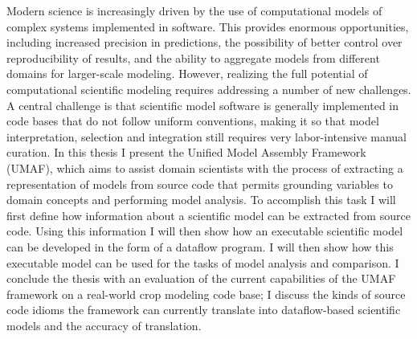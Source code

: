 
\noindent Modern science is increasingly driven by the use of computational models of complex systems implemented in software.
This provides enormous opportunities, including increased precision in predictions, the possibility of better control over reproducibility of results, and the ability to aggregate models from different domains for larger-scale modeling.
However, realizing the full potential of computational scientific modeling requires addressing a number of new challenges.
A central challenge is that scientific model software is generally implemented in code bases that do not follow uniform conventions, making it so that model interpretation, selection and integration still requires very labor-intensive manual curation.
In this thesis I present the Unified Model Assembly Framework (UMAF), which aims to assist domain scientists with the process of extracting a representation of models from source code that permits grounding variables to domain concepts and performing model analysis.
To accomplish this task I will first define how information about a scientific model can be extracted from source code.
Using this information I will then show how an executable scientific model can be developed in the form of a dataflow program.
I will then show how this executable model can be used for the tasks of model analysis and comparison.
I conclude the thesis with an evaluation of the current capabilities of the UMAF framework on a real-world crop modeling code base; I discuss the kinds of source code idioms the framework can currently translate into dataflow-based scientific models and the accuracy of translation.
